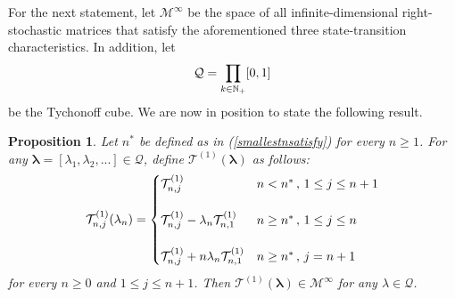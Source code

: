 \documentclass[a4paper,12pt]{article}
\newtheorem{prop}[thm]{Proposition}
\def\N{\mathbb{N}}
\def\T{\mathcal{T}}
\begin{document}
For the next statement, let $\mathcal{M}^{\infty}$ be the space of all infinite-dimensional right-stochastic matrices that satisfy the aforementioned three state-transition  characteristics. In addition, let 
\begin{align}
\mathcal{Q} = \prod_{k\in\N_+} [0,1] \notag 
\end{align}
be the Tychonoff cube. We are now in position to state the following result.
\begin{prop}
\label{propstochastictransformation}
Let $n^*$ be defined as in (\ref{smallestnsatisfy}) for every $n\geq 1$. For any $\mathbf{\lambda} = [\lambda_1,\lambda_2,...] \in \mathcal{Q}$, define $\T^{(1)}(\mathbf{\lambda})$ as follows:
\begin{equation}
\label{infinitemanystochasticconstruct}
\T^{(1)}_{n,j}(\lambda_n) =
\begin{cases}
\T^{(1)}_{n,j} & n < n^* \, ,\, 1 \leq j \leq n+1 \\ 
\notag\\
\T^{(1)}_{n,j} - \lambda_n\T^{(1)}_{n,1} & n \geq n^* \, ,\, 1 \leq j \leq n  \\
\notag \\
\T^{(1)}_{n,j} + n\lambda_n\T^{(1)}_{n,1} & n \geq n^* \, ,\, j = n+1  \\
\end{cases}
\end{equation}
for every $n\geq 0$ and $1\leq j \leq n+1$. Then $\T^{(1)}(\mathbf{\lambda}) \in \mathcal{M}^{\infty}$ for any $\lambda\in\mathcal{Q}$.
\end{prop}
\end{document}
